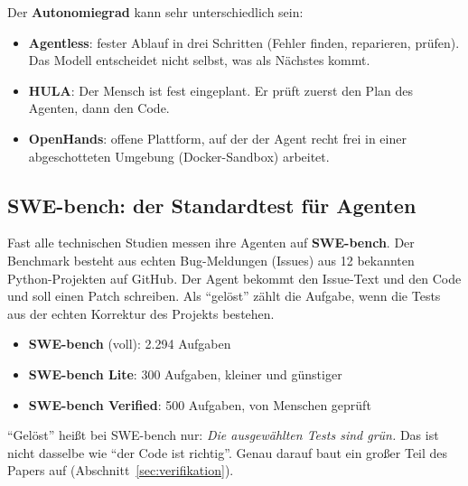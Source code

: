\documentclass[11pt,a4paper,parskip=half]{scrartcl}
\begin{document}
Der \textbf{Autonomiegrad} kann sehr unterschiedlich sein:
\begin{itemize}
\item \textbf{Agentless}: fester Ablauf in drei Schritten (Fehler finden, reparieren, prüfen). Das Modell entscheidet nicht selbst, was als Nächstes kommt.
\item \textbf{HULA}: Der Mensch ist fest eingeplant. Er prüft zuerst den Plan des Agenten, dann den Code.
\item \textbf{OpenHands}: offene Plattform, auf der der Agent recht frei in einer abgeschotteten Umgebung (Docker-Sandbox) arbeitet.
\end{itemize}

\subsection{SWE-bench: der Standardtest für Agenten}
Fast alle technischen Studien messen ihre Agenten auf \textbf{SWE-bench}. Der Benchmark besteht aus echten Bug-Meldungen (Issues) aus 12 bekannten Python-Projekten auf GitHub. Der Agent bekommt den Issue-Text und den Code und soll einen Patch schreiben. Als \enquote{gelöst} zählt die Aufgabe, wenn die Tests aus der echten Korrektur des Projekts bestehen.
\begin{itemize}
\item \textbf{SWE-bench} (voll): 2.294 Aufgaben
\item \textbf{SWE-bench Lite}: 300 Aufgaben, kleiner und günstiger
\item \textbf{SWE-bench Verified}: 500 Aufgaben, von Menschen geprüft
\end{itemize}

\begin{falle}
\enquote{Gelöst} heißt bei SWE-bench nur: \emph{Die ausgewählten Tests sind grün.} Das ist nicht dasselbe wie \enquote{der Code ist richtig}. Genau darauf baut ein großer Teil des Papers auf (Abschnitt~\ref{sec:verifikation}).
\end{falle}
\end{document}
